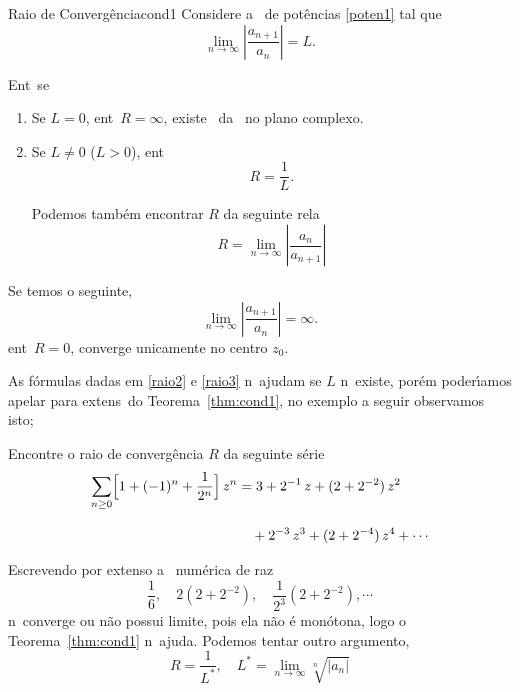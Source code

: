 \begin{theoc}{Raio de Converg\^encia}{cond1}
Considere a \ser\ de pot\^{e}ncias \eqref{poten1} tal que
\begin{equation*}
  \lim_{n\to\infty}\left|\frac{a_{n+1}}{a_n}\right|=L.
\end{equation*}

 Ent\ao\ se
\begin{enumerate}[label=(\alph*),leftmargin=4em,ref=(\alph*)]
  \item Se $L=0$, ent\ao\ $R=\infty$, existe \conver\ da \ser\ no
  plano complexo.
  \item Se $L\neq 0$ ($L>0$), ent\ao
\begin{equation}\label{raio2}
  R=\dfrac{1}{L}.
\end{equation}

Podemos tamb\'em encontrar $R$ da seguinte rela\cao\
\begin{equation}\label{raio3}
  R=\lim_{n\to\infty}\left|\frac{a_{n}}{a_{n+1}}\right|
\end{equation}
\end{enumerate}

Se temos o seguinte,
\begin{equation*}
\lim_{n\to\infty}\left|\frac{a_{n+1}}{a_n}\right|=\infty.
\end{equation*}
ent\ao\ $R=0$, converge unicamente no centro $z_{0}$.
\end{theoc}

\begin{obs}
As f\'ormulas dadas em \eqref{raio2} e \eqref{raio3} n\ao\ ajudam
se $L$ n\ao\ existe, por\'em poder\'{\i}amos apelar para extens\oes\ do
Teorema~\ref{thm:cond1}, no exemplo a seguir observamos isto;
\end{obs}

\begin{exer}
Encontre o raio de converg\^{e}ncia $R$ da seguinte s\'{e}rie
\begin{align*}
  \sum_{n\geq 0}\Bigl[1+(-1)^n+\frac{1}{2^n}\Bigr]\,z^n
  &=3+2^{-1}\,z+(2+2^{-2})\,z^2\\[2ex]
  &\quad+2^{-3}\,z^3+(2+2^{-4})\,z^4+\cdots
\end{align*}
\end{exer}

\solo Escrevendo por extenso a \seq\ num\'{e}rica de raz\oes\ 
\begin{equation*}
 \dfrac{1}{6},\quad  2(2+2^{-2}),\quad \dfrac{1}{2^3}(2+2^{-2}),\cdots
\end{equation*}
n\ao\ converge ou n\~{a}o possui limite, pois ela n\~{a}o \'{e} mon\'{o}tona, logo o 
Teorema~\ref{thm:cond1} n\ao\ ajuda. Podemos tentar outro argumento,
\begin{equation*}
  R=\frac{1}{L^{\ast}},\quad L^{\ast}=\lim_{n\to\infty}\sqrt[n]{|a_n|}
\end{equation*}

